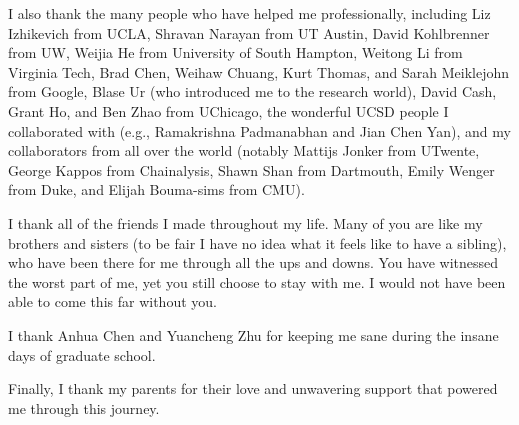 \documentclass[12pt]{ucsddissertation}
\begin{document}
\begin{acknowledgements}
I also thank the many people who have helped me professionally, including Liz Izhikevich from UCLA, Shravan Narayan from UT Austin, David Kohlbrenner from UW, Weijia He from University of South Hampton, Weitong Li from Virginia Tech, Brad Chen, Weihaw Chuang, Kurt Thomas, and Sarah Meiklejohn from Google, Blase Ur (who introduced me to the research world), David Cash, Grant Ho, and Ben Zhao from UChicago, the wonderful UCSD people I collaborated with (e.g., Ramakrishna Padmanabhan and Jian Chen Yan), and my collaborators from all over the world (notably Mattijs Jonker from UTwente, George Kappos from Chainalysis, Shawn Shan from Dartmouth, Emily Wenger from Duke, and Elijah Bouma-sims from CMU).

I thank all of the friends I made throughout my life. Many of you are like my brothers and sisters (to be fair I have no idea what it feels like to have a sibling), who have been there for me through all the ups and downs. You have witnessed the worst part of me, yet you still choose to stay with me. I would not have been able to come this far without you. 

I thank Anhua Chen and Yuancheng Zhu for keeping me sane during the insane days of graduate school.

Finally, I thank my parents for their love and unwavering support that powered me through this journey.



\end{acknowledgements}
\end{document}
